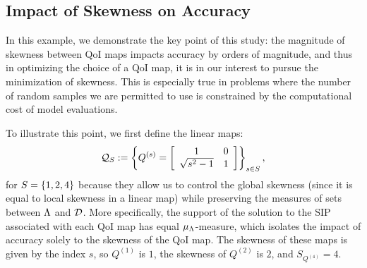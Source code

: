 \subsection{Impact of Skewness on Accuracy}\label{ex:skewness}
In this example, we demonstrate the key point of this study: the magnitude of skewness between QoI maps impacts accuracy by orders of magnitude, and thus in optimizing the choice of a QoI map, it is in our interest to pursue the minimization of skewness.
This is especially true in problems where the number of random samples we are permitted to use is constrained by the computational cost of model evaluations.


To illustrate this point, we first define the linear maps:
\begin{equation}\label{eq:qmap2}
\qspace_S := \left \lbrace Q^{(s)} =  \mat{cc}{1 & 0 \\ \sqrt{s^2 - 1}& 1 } \right \rbrace_{s\in S},
\end{equation}
for $S=\set{1,2,4}$ because they allow us to control the global skewness (since it is equal to local skewness in a linear map) while preserving the measures of sets between $\pspace$ and $\dspace$.
More specifically, the support of the solution to the SIP associated with each QoI map has equal $\mu_\pspace$-measure, which isolates the impact of accuracy solely to the skewness of the QoI map.
The skewness of these maps is given by the index $s$, so $Q^{(1)}$ is $1$, the skewness of $Q^{(2)}$ is $2$, and $S_{Q^{(4)}} = 4$.


